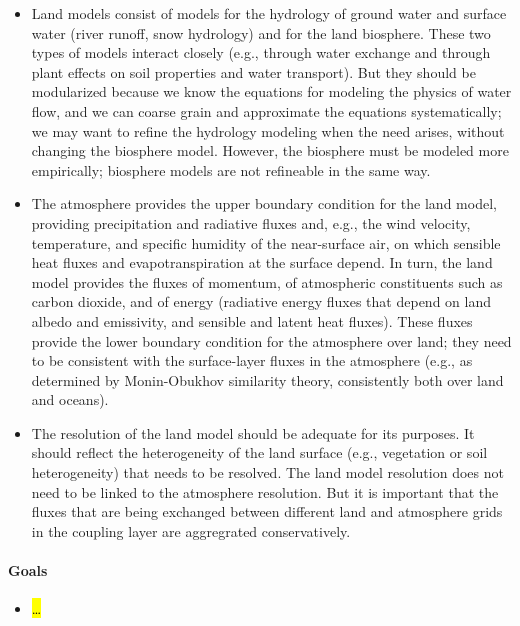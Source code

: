 \documentclass{article}
\begin{document}
\begin{itemize}
    \item Land models consist of models for the hydrology of ground water and surface water (river runoff, snow hydrology) and for the land biosphere. These two types of models interact closely (e.g., through water exchange and through plant effects on soil properties and water transport). But they should be modularized because we know the equations for modeling the physics of water flow, and we can coarse grain and approximate the equations systematically; we may want to refine the hydrology modeling when the need arises, without changing the biosphere model. However, the biosphere must be modeled more empirically; biosphere models are not refineable in the same way. 
    \item The atmosphere provides the upper boundary condition for the land model, providing precipitation and radiative fluxes and, e.g., the wind velocity, temperature, and specific humidity of the near-surface air, on which sensible heat fluxes and evapotranspiration at the surface depend. In turn, the land model provides the fluxes of momentum, of atmospheric constituents such as carbon dioxide, and of energy (radiative energy fluxes that depend on land albedo and emissivity, and sensible and latent heat fluxes). These fluxes provide the lower boundary condition for the atmosphere over land; they need to be consistent with the surface-layer fluxes in the atmosphere (e.g., as determined by Monin-Obukhov similarity theory, consistently both over land and oceans).
    \item The resolution of the land model should be adequate for its purposes. It should reflect the heterogeneity of the land surface (e.g., vegetation or soil heterogeneity) that needs to be resolved. The land model resolution does not need to be linked to the atmosphere resolution. But it is important that the fluxes that are being exchanged between different land and atmosphere grids in the coupling layer are aggregrated conservatively. 
\end{itemize}

\paragraph{Goals}

\begin{itemize}
    \item \hl{\dots}
\end{itemize}
\end{document}

